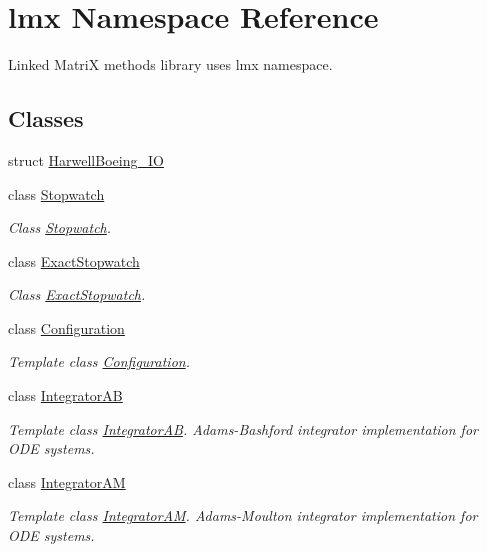 \hypertarget{namespacelmx}{\section{lmx Namespace Reference}
\label{namespacelmx}
}


Linked Matri\-X methods library uses lmx namespace.  


\subsection*{Classes}
\begin{DoxyCompactItemize}
\item 
struct \hyperlink{structlmx_1_1HarwellBoeing__IO}{Harwell\-Boeing\-\_\-\-I\-O}
\item 
class \hyperlink{classlmx_1_1Stopwatch}{Stopwatch}
\begin{DoxyCompactList}\small\item\em Class \hyperlink{classlmx_1_1Stopwatch}{Stopwatch}. \end{DoxyCompactList}\item 
class \hyperlink{classlmx_1_1ExactStopwatch}{Exact\-Stopwatch}
\begin{DoxyCompactList}\small\item\em Class \hyperlink{classlmx_1_1ExactStopwatch}{Exact\-Stopwatch}. \end{DoxyCompactList}\item 
class \hyperlink{classlmx_1_1Configuration}{Configuration}
\begin{DoxyCompactList}\small\item\em Template class \hyperlink{classlmx_1_1Configuration}{Configuration}. \end{DoxyCompactList}\item 
class \hyperlink{classlmx_1_1IntegratorAB}{Integrator\-A\-B}
\begin{DoxyCompactList}\small\item\em Template class \hyperlink{classlmx_1_1IntegratorAB}{Integrator\-A\-B}. Adams-\/\-Bashford integrator implementation for O\-D\-E systems. \end{DoxyCompactList}\item 
class \hyperlink{classlmx_1_1IntegratorAM}{Integrator\-A\-M}
\begin{DoxyCompactList}\small\item\em Template class \hyperlink{classlmx_1_1IntegratorAM}{Integrator\-A\-M}. Adams-\/\-Moulton integrator implementation for O\-D\-E systems. \end{DoxyCompactList}\item 

\end{DoxyCompactItemize}
